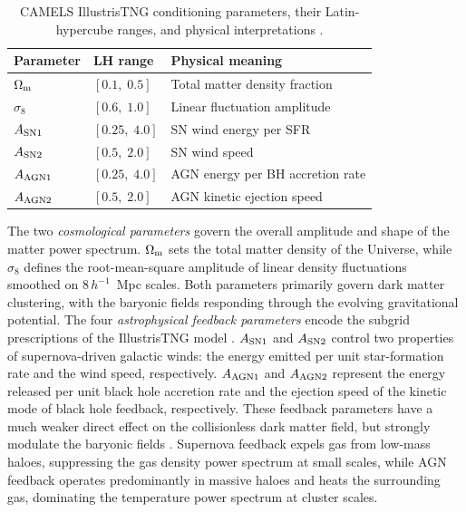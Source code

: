 \documentclass{article}
\newcommand{\Om}{\Omega_{\rm m}}
\newcommand{\sig}{\sigma_8}
\begin{document}
\begin{table}
  \centering
  \small
  \setlength{\tabcolsep}{4pt}
  \renewcommand{\arraystretch}{1.08}
  \begin{tabular*}{\columnwidth}{@{\extracolsep{\fill}}lll@{}}
    \toprule
    Parameter & LH range & Physical meaning \\
    \midrule
    $\Om$          & $[0.1,\;0.5]$  & Total matter density fraction \\
    $\sig$         & $[0.6,\;1.0]$  & Linear fluctuation amplitude \\
    $A_{\rm SN1}$  & $[0.25,\;4.0]$ & SN wind energy per SFR \\
    $A_{\rm SN2}$  & $[0.5,\;2.0]$  & SN wind speed \\
    $A_{\rm AGN1}$ & $[0.25,\;4.0]$ & AGN energy per BH accretion rate \\
    $A_{\rm AGN2}$ & $[0.5,\;2.0]$  & AGN kinetic ejection speed \\
    \bottomrule
  \end{tabular*}
  \caption{CAMELS IllustrisTNG conditioning parameters, their
    Latin-hypercube ranges, and physical interpretations
    \citep{Villaescusa2021,Villaescusa2022}.}
  \label{tab:params}
\end{table}

The two \emph{cosmological parameters} govern the overall amplitude
and shape of the matter power spectrum.
$\Om$ sets the total matter density of the Universe, while
$\sig$ defines the root-mean-square amplitude of linear density
fluctuations smoothed on $8\,h^{-1}$~Mpc scales.
Both parameters primarily govern dark matter clustering, with the
baryonic fields responding through the evolving gravitational
potential.
The four \emph{astrophysical feedback parameters} encode the
subgrid prescriptions of the IllustrisTNG model
\citep{Weinberger2017,Pillepich2018IllustrisTNG}.
$A_{\rm SN1}$ and $A_{\rm SN2}$ control two properties of
supernova-driven galactic winds: the energy emitted per unit
star-formation rate and the wind speed, respectively.
$A_{\rm AGN1}$ and $A_{\rm AGN2}$ represent the energy released per
unit black hole accretion rate and the ejection speed of the kinetic
mode of black hole feedback, respectively.
These feedback parameters have a much weaker direct effect on the
collisionless dark matter field, but strongly modulate the
baryonic fields \citep{Villaescusa2021}. Supernova feedback expels gas
from low-mass haloes, suppressing the gas density power spectrum at
small scales, while AGN feedback operates predominantly in massive
haloes and heats the surrounding gas, dominating the temperature power
spectrum at cluster scales.
\end{document}
